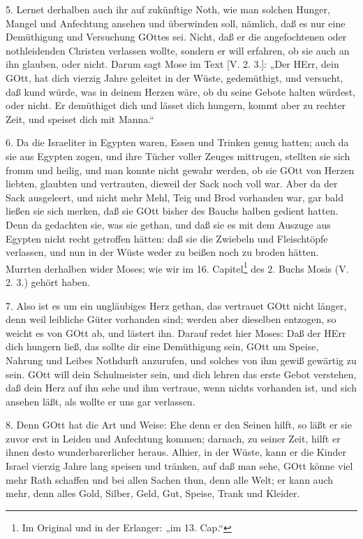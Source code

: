 5. Lernet derhalben auch ihr auf zukünftige Noth, wie man solchen Hunger, Mangel und Anfechtung ansehen und überwinden soll, nämlich, daß es nur eine Demüthigung und Versuchung GOttes sei. Nicht, daß er die angefochtenen oder nothleidenden Christen verlassen wollte, sondern er will erfahren, ob sie auch an ihn glauben, oder nicht. Darum sagt Mose im Text [V. 2. 3.]: „Der HErr, dein GOtt, hat dich vierzig Jahre geleitet in der Wüste, gedemüthigt, und versucht, daß kund würde, was in deinem Herzen wäre, ob du seine Gebote halten würdest, oder nicht. Er demüthiget dich und lässet dich hungern, kommt aber zu rechter Zeit, und speiset dich mit Manna.“

6. Da die Israeliter in Egypten waren, Essen und Trinken genug hatten; auch da sie aus Egypten zogen, und ihre Tücher voller Zeuges mittrugen, stellten sie sich fromm und heilig, und man konnte nicht gewahr werden, ob sie GOtt von Herzen liebten, glaubten und vertrauten, dieweil der Sack noch voll war. Aber da der Sack ausgeleert, und nicht mehr Mehl, Teig und Brod vorhanden war, gar bald ließen sie sich merken, daß sie GOtt bisher des Bauchs halben gedient hatten. Denn da gedachten sie, was sie gethan, und daß sie es mit dem Auszuge aus Egypten nicht recht getroffen hätten: daß sie die Zwiebeln und Fleischtöpfe verlassen, und nun in der Wüste weder zu beißen noch zu broden hätten. Murrten derhalben wider Moses; wie wir im 16. Capitel\footnote{Im Original und in der Erlanger: „im 13. Cap.“} des 2. Buchs Mosis (V. 2. 3.) gehört haben.

7. Also ist es um ein ungläubiges Herz gethan, das vertrauet GOtt nicht länger, denn weil leibliche Güter vorhanden sind; werden aber dieselben entzogen, so weicht es von GOtt ab, und lästert ihn. Darauf redet hier Moses: Daß der HErr dich hungern ließ, das sollte dir eine Demüthigung sein, GOtt um Speise, Nahrung und Leibes Nothdurft anzurufen, und solches von ihm gewiß gewärtig zu sein. GOtt will dein Schulmeister sein, und dich lehren das erste Gebot verstehen, daß dein Herz auf ihn sehe und ihm vertraue, wenn nichts vorhanden ist, und sich ansehen läßt, als wollte er uns gar verlassen.

8. Denn GOtt hat die Art und Weise: Ehe denn er den Seinen hilft, so läßt er sie zuvor erst in Leiden und Anfechtung kommen; darnach, zu seiner Zeit, hilft er ihnen desto wunderbarerlicher heraus. Alhier, in der Wüste, kann er die Kinder Israel vierzig Jahre lang speisen und tränken, auf daß man sehe, GOtt könne viel mehr Rath schaffen und bei allen Sachen thun, denn alle Welt; er kann auch mehr, denn alles Gold, Silber, Geld, Gut, Speise, Trank und Kleider.

